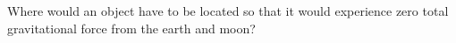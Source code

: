 Where would an object have to be located so that it
would experience zero total gravitational force from the earth and moon?\answercheck
